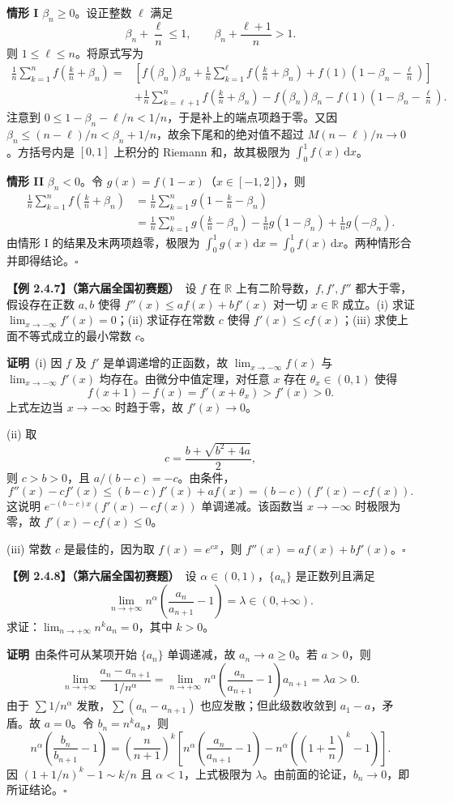 \documentclass[UTF8,a4paper,11pt]{ctexart}
\newcommand{\ex}[2]{\par\medskip\noindent\textbf{【例 #1】（#2）}\ }
\newcommand{\pf}{\par\noindent\textbf{证明}\ }
\begin{document}
\textbf{情形 I} $\beta_n\ge0$。设正整数 $\ell$ 满足
\[
\beta_n+\frac\ell n\le1,\qquad \beta_n+\frac{\ell+1}{n}>1.
\]
则 $1\le\ell\le n$。将原式写为
\begin{align*}
\frac1n\sum_{k=1}^{n}f\!\left(\frac{k}{n}+\beta_n\right)
={}&\left[f(\beta_n)\beta_n+\frac1n\sum_{k=1}^{\ell}f\!\left(\frac{k}{n}+\beta_n\right)
+f(1)\left(1-\beta_n-\frac\ell n\right)\right]\\
&+\frac1n\sum_{k=\ell+1}^{n}f\!\left(\frac{k}{n}+\beta_n\right)
-f(\beta_n)\beta_n-f(1)\left(1-\beta_n-\frac\ell n\right).
\end{align*}
注意到 $0\le1-\beta_n-\ell/n<1/n$，于是补上的端点项趋于零。又因 $\beta_n\le(n-\ell)/n<\beta_n+1/n$，故余下尾和的绝对值不超过 $M(n-\ell)/n\to0$。方括号内是 $[0,1]$ 上积分的 Riemann 和，故其极限为 $\int_0^1 f(x)\,\mathrm dx$。

\textbf{情形 II} $\beta_n<0$。令 $g(x)=f(1-x)$（$x\in[-1,2]$），则
\begin{align*}
\frac1n\sum_{k=1}^{n}f\!\left(\frac{k}{n}+\beta_n\right)
&=\frac1n\sum_{k=1}^{n}g\!\left(1-\frac{k}{n}-\beta_n\right)\\
&=\frac1n\sum_{k=1}^{n}g\!\left(\frac{k}{n}-\beta_n\right)
-\frac1n g(1-\beta_n)+\frac1n g(-\beta_n).
\end{align*}
由情形 I 的结果及末两项趋零，极限为 $\int_0^1g(x)\,\mathrm dx=\int_0^1f(x)\,\mathrm dx$。两种情形合并即得结论。\hfill$\square$

\ex{2.4.7}{第六届全国初赛题}设 $f$ 在 $\mathbb R$ 上有二阶导数，$f,f',f''$ 都大于零，假设存在正数 $a,b$ 使得 $f''(x)\le a f(x)+b f'(x)$ 对一切 $x\in\mathbb R$ 成立。(i) 求证 $\lim_{x\to-\infty}f'(x)=0$；(ii) 求证存在常数 $c$ 使得 $f'(x)\le c f(x)$；(iii) 求使上面不等式成立的最小常数 $c$。
\pf (i) 因 $f$ 及 $f'$ 是单调递增的正函数，故 $\lim_{x\to-\infty}f(x)$ 与 $\lim_{x\to-\infty}f'(x)$ 均存在。由微分中值定理，对任意 $x$ 存在 $\theta_x\in(0,1)$ 使得
\[
f(x+1)-f(x)=f'(x+\theta_x)>f'(x)>0.
\]
上式左边当 $x\to-\infty$ 时趋于零，故 $f'(x)\to0$。

(ii) 取
\[
c=\frac{b+\sqrt{b^2+4a}}2,
\]
则 $c>b>0$，且 $a/(b-c)=-c$。由条件，
\[
f''(x)-cf'(x)\le(b-c)f'(x)+af(x)=(b-c)(f'(x)-cf(x)).
\]
这说明 $e^{-(b-c)x}(f'(x)-cf(x))$ 单调递减。该函数当 $x\to-\infty$ 时极限为零，故 $f'(x)-cf(x)\le0$。

(iii) 常数 $c$ 是最佳的，因为取 $f(x)=e^{cx}$，则 $f''(x)=af(x)+bf'(x)$。\hfill$\square$

\ex{2.4.8}{第六届全国初赛题}设 $\alpha\in(0,1)$，$\{a_n\}$ 是正数列且满足
\[
\lim_{n\to+\infty}n^\alpha\left(\frac{a_n}{a_{n+1}}-1\right)=\lambda\in(0,+\infty).
\]
求证：$\lim_{n\to+\infty}n^ka_n=0$，其中 $k>0$。
\pf 由条件可从某项开始 $\{a_n\}$ 单调递减，故 $a_n\to a\ge0$。若 $a>0$，则
\[
\lim_{n\to+\infty}\frac{a_n-a_{n+1}}{1/n^\alpha}
=\lim_{n\to+\infty}n^\alpha\left(\frac{a_n}{a_{n+1}}-1\right)a_{n+1}=\lambda a>0.
\]
由于 $\sum 1/n^\alpha$ 发散，$\sum(a_n-a_{n+1})$ 也应发散；但此级数收敛到 $a_1-a$，矛盾。故 $a=0$。令 $b_n=n^ka_n$，则
\[
n^\alpha\left(\frac{b_n}{b_{n+1}}-1\right)
=\left(\frac{n}{n+1}\right)^k
\left[n^\alpha\left(\frac{a_n}{a_{n+1}}-1\right)
-n^\alpha\left(\left(1+\frac1n\right)^k-1\right)\right].
\]
因 $\left(1+1/n\right)^k-1\sim k/n$ 且 $\alpha<1$，上式极限为 $\lambda$。由前面的论证，$b_n\to0$，即所证结论。\hfill$\square$
\end{document}
